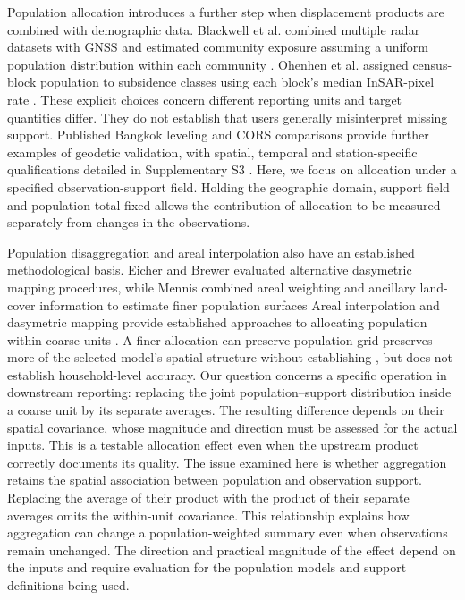 \documentclass[pdflatex,sn-nature]{sn-jnl}
\providecommand{\DIFadd}[1]{{\protect\color{blue} \sf #1}} %
\providecommand{\DIFdel}[1]{{\protect\color{red} \scriptsize #1}} %
\providecommand{\DIFaddbegin}{} %
\providecommand{\DIFaddend}{} %
\providecommand{\DIFdelbegin}{} %
\providecommand{\DIFdelend}{} %
\begin{document}
\DIFadd{Population allocation introduces a further step when displacement products are combined with demographic data. Blackwell et al. combined multiple radar datasets with GNSS and estimated community exposure assuming a uniform population distribution within each community \citep{blackwell2020california}. Ohenhen et al. assigned census-block population to subsidence classes using each block's median InSAR-pixel rate \citep{ohenhen2025uscities}. These explicit choices concern different }\DIFaddend reporting units and target quantities\DIFdelbegin \DIFdel{differ. They do not establish that users generally misinterpret missing support. Published Bangkok leveling and CORS comparisons provide further examples of geodetic validation, with spatial, temporal and station-specific qualifications detailed in Supplementary S3 \citep{luachapichatikul2020bangkok,pumpuang2024bangkapi,aieorattanawadee2022bangkok}}\DIFdelend . \DIFaddbegin \DIFadd{Here, we focus on allocation under a specified observation-support field. Holding the geographic domain, support field and population total fixed allows the contribution of allocation to be measured separately from changes in the observations.
}\DIFaddend 

\DIFdelbegin \DIFdel{Population disaggregation and areal interpolation also have an established methodological basis. Eicher and Brewer evaluated alternative dasymetric mapping procedures, while Mennis combined areal weighting and ancillary land-cover information to estimate finer population surfaces }\DIFdelend \DIFaddbegin \DIFadd{Areal interpolation and dasymetric mapping provide established approaches to allocating population within coarse units }\DIFaddend \citep{eicher2001dasymetric,mennis2003population}. A finer \DIFdelbegin \DIFdel{allocation can preserve }\DIFdelend \DIFaddbegin \DIFadd{population grid preserves more of }\DIFaddend the selected model's spatial structure\DIFdelbegin \DIFdel{without establishing }\DIFdelend \DIFaddbegin \DIFadd{, but does not establish }\DIFaddend household-level accuracy. \DIFdelbegin \DIFdel{Our question concerns a specific operation in downstream reporting: replacing the joint population--support distribution inside a coarse unit by its separate averages. The resulting difference depends on their spatial covariance, whose magnitude and direction must be assessed for the actual inputs. This is a testable allocation effect even when the upstream product correctly documents its quality. }\DIFdelend \DIFaddbegin \DIFadd{The issue examined here is whether aggregation retains the spatial association between population and observation support. Replacing the average of their product with the product of their separate averages omits the within-unit covariance. This relationship explains how aggregation can change a population-weighted summary even when observations remain unchanged. The direction and practical magnitude of the effect depend on the inputs and require evaluation for the population models and support definitions being used.
}\DIFaddend 
\end{document}
